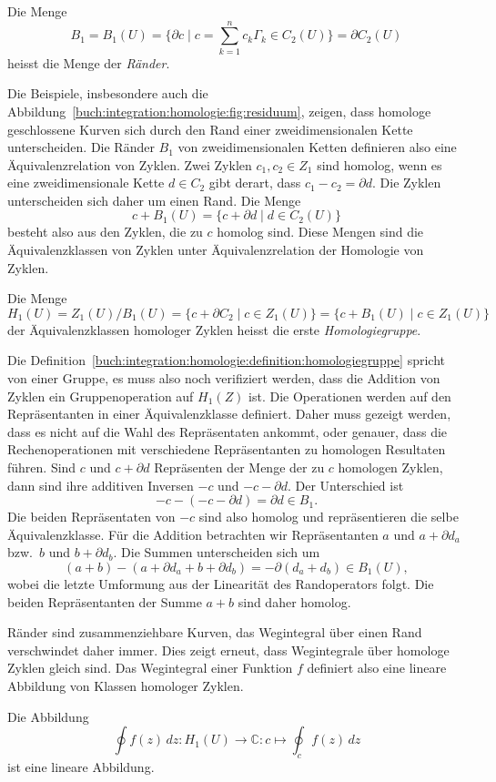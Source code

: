 \begin{definition}[Ränder]
Die Menge
\[
B_1
=
B_1(U)
=
\biggl\{
\partial c
\;
\bigg|
\;
c = \sum_{k=1}^n c_k \Gamma_k\in C_2(U)
\biggr\}
=
\partial C_2(U)
\]
heisst die Menge der \emph{Ränder}.
%
\end{definition}

Die Beispiele, insbesondere auch die
Abbildung~\ref{buch:integration:homologie:fig:residuum}, zeigen,
dass homologe geschlossene Kurven sich durch den Rand einer
zweidimensionalen Kette unterscheiden.
Die Ränder $B_1$ von zweidimensionalen Ketten definieren also
eine Äquivalenzrelation von Zyklen.
Zwei Zyklen $c_1, c_2\in Z_1$ sind homolog, wenn es eine
zweidimensionale Kette $d\in C_2$ gibt derart, dass $c_1-c_2=\partial d$.
Die Zyklen unterscheiden sich daher um einen Rand.
Die Menge
\[
c+B_1(U)
=
\{
c+\partial d
\mid
d\in C_2(U)
\}
\]
besteht also aus den Zyklen, die zu $c$ homolog sind.
Diese Mengen sind die Äquivalenzklassen von Zyklen unter Äquivalenzrelation
der Homologie von Zyklen.

\begin{definition}[Homologiegruppe]
\label{buch:integration:homologie:definition:homologiegruppe}
Die Menge
\[
H_1(U)
=
Z_1(U)/B_1(U)
=
\{
c + \partial C_2
\mid
c\in Z_1(U)
\}
=
\{
c+ B_1(U)
\mid
c\in Z_1(U)
\}
\]
der Äquivalenzklassen homologer Zyklen heisst die erste
\emph{Homologiegruppe}.
%
\end{definition}

Die Definition~\ref{buch:integration:homologie:definition:homologiegruppe}
spricht von einer Gruppe, es muss also noch verifiziert
werden, dass die Addition von Zyklen ein Gruppenoperation auf $H_1(Z)$ ist.
Die Operationen werden auf den Repräsentanten in einer Äquivalenzklasse
definiert.
Daher muss gezeigt werden, dass es nicht auf die Wahl des Repräsentaten
ankommt, oder genauer, dass die Rechenoperationen mit verschiedene
Repräsentanten zu homologen Resultaten führen.
Sind $c$ und $c+\partial d$ Repräsenten der Menge der zu $c$
homologen Zyklen, dann sind ihre additiven Inversen
\(
-c
\)
und
\(
-c-\partial d
\).
Der Unterschied ist
\[
-c
-(
-c-\partial d
)
=
\partial d \in B_1.
\]
Die beiden Repräsentaten von $-c$ sind also homolog und repräsentieren
die selbe Äquivalenzklasse.
Für die Addition betrachten wir Repräsentanten $a$ und $a+\partial d_a$
bzw.~$b$ und $b+\partial d_b$.
Die Summen unterscheiden sich um
\[
(a+b)-(a+\partial d_a+b+\partial d_b)
=
-\partial(d_a+d_b)
\in
B_1(U),
\]
wobei die letzte Umformung aus der Linearität des Randoperators folgt.
Die beiden Repräsentanten der Summe $a+b$ sind daher homolog.

Ränder sind zusammenziehbare Kurven, das Wegintegral über einen
Rand verschwindet daher immer.
Dies zeigt erneut, dass Wegintegrale über homologe Zyklen gleich sind.
Das Wegintegral einer Funktion $f$ definiert also eine lineare Abbildung
von Klassen homologer Zyklen.

\begin{satz}
Die Abbildung
\[
\oint f(z)\,dz
\colon
H_1(U) \to \mathbb{C}
:
c
\mapsto
\oint_c f(z)\,dz
\]
ist eine lineare Abbildung.
\end{satz}
